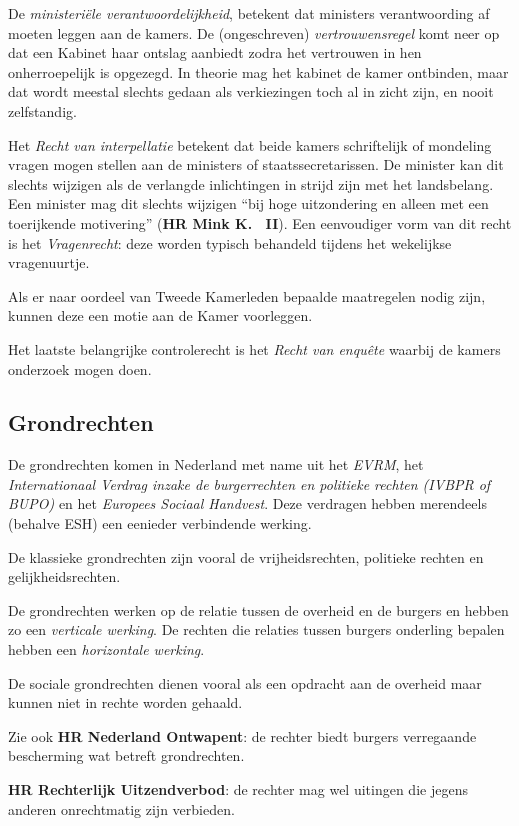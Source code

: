 \documentclass{article}
\begin{document}
De \emph{ministeri\"ele verantwoordelijkheid}, betekent dat ministers
verantwoording af moeten leggen aan de kamers. De (ongeschreven)
\emph{vertrouwensregel} komt neer op dat een Kabinet haar ontslag aanbiedt
zodra het vertrouwen in hen onherroepelijk is opgezegd. In theorie mag het
kabinet de kamer ontbinden, maar dat wordt meestal slechts gedaan als
verkiezingen toch al in zicht zijn, en nooit zelfstandig.

Het \emph{Recht van interpellatie} betekent dat beide kamers schriftelijk of
mondeling vragen mogen stellen aan de ministers of staatssecretarissen. De
minister kan dit slechts wijzigen als de verlangde inlichtingen in strijd zijn
met het landsbelang. Een minister mag dit slechts wijzigen ``bij hoge
uitzondering en alleen met een toerijkende motivering'' (\textbf{HR Mink K.~
II}). Een eenvoudiger vorm van dit recht is het \emph{Vragenrecht}: deze worden
typisch behandeld tijdens het wekelijkse vragenuurtje.

Als er naar oordeel van Tweede Kamerleden bepaalde maatregelen nodig zijn,
kunnen deze een motie aan de Kamer voorleggen. 

Het laatste belangrijke controlerecht is het \emph{Recht van enqu\^ete} waarbij
de kamers onderzoek mogen doen.

\subsection{Grondrechten}

De grondrechten komen in Nederland met name uit het \emph{EVRM}, het
\emph{Internationaal Verdrag inzake de burgerrechten en politieke rechten
(IVBPR of BUPO)} en het \emph{Europees Sociaal Handvest}. Deze verdragen
hebben merendeels (behalve ESH) een eenieder verbindende werking. 

De klassieke grondrechten zijn vooral de vrijheidsrechten, politieke rechten
en gelijkheidsrechten. 

De grondrechten werken op de relatie tussen de overheid en de burgers en 
hebben zo een \emph{verticale werking}. De rechten die relaties tussen
burgers onderling bepalen hebben een \emph{horizontale werking}.

De sociale grondrechten dienen vooral als een opdracht aan de overheid maar 
kunnen niet in rechte worden gehaald.

Zie ook \textbf{HR Nederland Ontwapent}: de rechter biedt burgers verregaande
bescherming wat betreft grondrechten.

\textbf{HR Rechterlijk Uitzendverbod}: de rechter mag wel uitingen die jegens
anderen onrechtmatig zijn verbieden.
\end{document}
